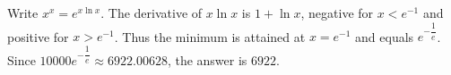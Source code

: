 Write $x^x=e^{x\ln x}$. The derivative of $x\ln x$ is $1+\ln x$, negative for $x<e^{-1}$ and positive for $x>e^{-1}$. Thus the minimum is attained at $x=e^{-1}$ and equals $e^{-\dfrac{1}{e}}$. Since $10000e^{-\dfrac{1}{e}}\approx6922.00628$, the answer is $\boxed{6922}$.
